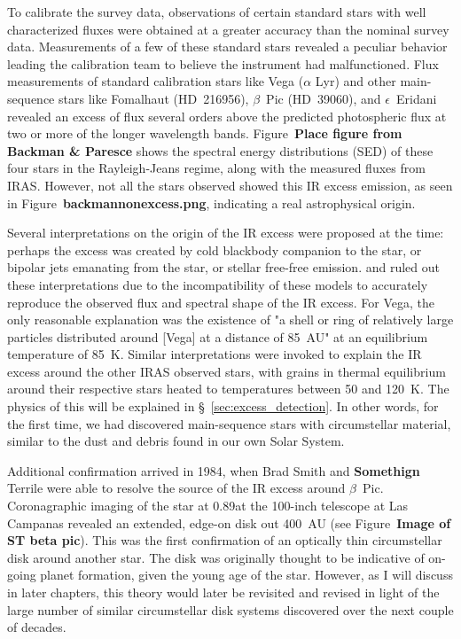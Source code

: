     To calibrate the survey data, observations of certain standard stars with well characterized fluxes were obtained at a greater accuracy than the nominal survey data. Measurements of a few of these standard stars revealed a peculiar behavior leading the calibration team to believe the instrument had malfunctioned. Flux measurements of standard calibration stars like Vega ($\alpha$ Lyr) and other main-sequence stars like Fomalhaut (HD~216956), $\beta$~Pic (HD~39060), and $\epsilon$~Eridani revealed an excess of flux several orders above the predicted photospheric flux at two or more of the longer wavelength bands\citep{Aumann1984}. Figure~\textbf{Place figure from Backman \& Paresce} shows the spectral energy distributions (SED) of these four stars in the Rayleigh-Jeans regime, along with the measured fluxes from IRAS. However, not all the stars observed showed this IR excess emission, as seen in Figure~\textbf{backmannonexcess.png}, indicating a real astrophysical origin. 
    
    Several interpretations on the origin of the IR excess were proposed at the time: perhaps the excess was created by cold blackbody companion to the star, or bipolar jets emanating from the star, or stellar free-free emission. \citet{Aumann1984} and \citet{Backman1993} ruled out these interpretations due to the incompatibility of these models to accurately reproduce the observed flux and spectral shape of the IR excess. For Vega, the only reasonable explanation was the existence of "a shell or ring of relatively large particles distributed around [Vega] at a distance of 85~AU" at an equilibrium temperature of 85~K\citep{Aumann1984}. Similar interpretations were invoked to explain the IR excess around the other IRAS observed stars, with grains in thermal equilibrium around their respective stars heated to temperatures between 50 and 120~K. The physics of this will be explained in \S~\ref{sec:excess_detection}. In other words, for the first time, we had discovered main-sequence stars with circumstellar material, similar to the dust and debris found in our own Solar System.
    
    Additional confirmation arrived in 1984, when Brad Smith and \textbf{Somethign} Terrile were able to resolve the source of the IR excess around $\beta$~Pic. Coronagraphic imaging of the star at 0.89\micron at the 100-inch telescope at Las Campanas revealed an extended, edge-on disk out 400~AU\citep{Smith1984} (see Figure~\textbf{Image of ST beta pic}). This was the first confirmation of an optically thin circumstellar disk around another star. The disk was originally thought to be indicative of on-going planet formation, given the young age of the star. However, as I will discuss in later chapters, this theory would later be revisited and revised in light of the large number of similar circumstellar disk systems discovered over the next couple of decades. 
    
